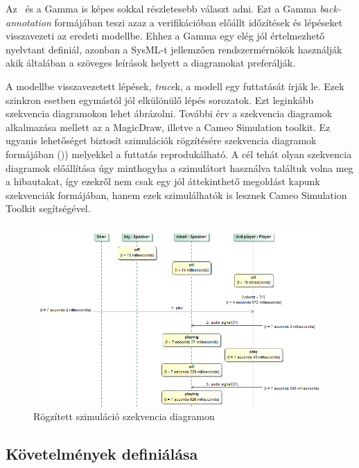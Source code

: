 Az \uppaal\ és a Gamma is képes sokkal részletesebb választ adni. Ezt a Gamma \emph{back-annotation} formájában teszi azaz a verifikációban előállt időzítések és lépéseket visszavezeti az eredeti modellbe. Ehhez a Gamma egy elég jól értelmezhető nyelvtant definiál, azonban a SysML-t jellemzően rendszermérnökök használják akik általában a szöveges leírások helyett a diagramokat preferálják.

A modellbe visszavezetett lépések, \emph{trace}k, a modell egy futtatását írják le. Ezek szinkron esetben egymástól jól elkülönülő lépés sorozatok. Ezt leginkább szekvencia diagramokon lehet ábrázolni. További érv a szekvencia diagramok alkalmazása mellett az a MagicDraw, illetve a Cameo Simulation toolkit. Ez ugyanis lehetőséget biztosít szimulációk rögzítésére szekvencia diagramok formájában ()) melyekkel a futtatás reprodukálható. A cél tehát olyan szekvencia diagramok előállítása úgy minthogyha a szimulátort használva találtuk volna meg a hibautakat, így ezekről nem csak egy jól áttekinthető megoldást kapunk szekvenciák formájában, hanem ezek szimulálhatók is lesznek Cameo Simulation Toolkit segítségével.

\begin{figure}[!ht]
	\centering
	\includegraphics[width=120mm, keepaspectratio]{figures/contribution/md-cameo-rec.png}
	\caption[]{Rögzített szimuláció szekvencia diagramon\footnotemark}
	\label{fig:md-cameo-rec}
\end{figure}


\subsection{Követelmények definiálása}

